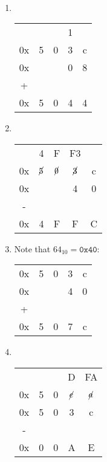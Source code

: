 \documentclass[12pt]{article}
\newenvironment{sol}[1][Solution]{\begin{trivlist}
		\item[\hskip \labelsep {\bfseries #1:}]}{\end{trivlist}}
\begin{document}
\begin{sol}
	\
	\begin{enumerate}[label=(\alph*)]
		\item 
		\
		\begin{center}
			\begin{tabular}{ccccc}
				{} & {}&{} & 1 & {}\\
				0x & 5 & 0 & 3 & c\\
				0x & {}& {}& 0 & 8\\
				+ & {} & {} & {} & {} \\
				\hline
				0x & 5 & 0 & 4 & 4
			\end{tabular}
		\end{center}
		\item
		\
		\begin{center}
			\begin{tabular}{ccccc}
				{} & 4 & F & {F3} & {}\\
				0x & $\cancel{5}$ & $\cancel{0}$ & $\cancel{3}$ & c\\
				0x & {}& {}& 4 & 0\\
				- & {} & {} & {} & {} \\
				\hline
				0x & 4 & F & F & C
			\end{tabular}
		\end{center}
		\item Note that $64_{10}=\texttt{0x40}$:
		\begin{center}
			\begin{tabular}{ccccc}
				0x & 5 & 0 & 3 & c\\
				0x & {}& {}& 4 & 0\\
				+ & {} & {} & {} & {} \\
				\hline
				0x & 5 & 0 & 7 & c
			\end{tabular}
		\end{center}
		\item
		\
		\begin{center}
			\begin{tabular}{ccccc}
				{} & {}&{} & D & FA\\
				0x & 5 & 0 & $\cancel{e}$ & $\cancel{a}$\\
				0x & 5 & 0 & 3 & c\\
				- & {} & {} & {} & {} \\
				\hline
				0x & 0 & 0 & A & E
			\end{tabular}
		\end{center}
	\end{enumerate}

\end{sol}
\end{document}
